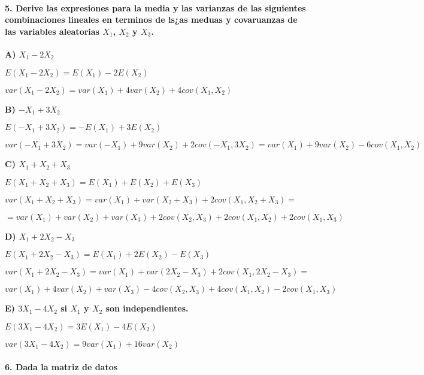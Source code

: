 \documentclass[
]{article}
\begin{document}
\hypertarget{derive-las-expresiones-para-la-media-y-las-varianzas-de-las-siguientes-combinaciones-lineales-en-terminos-de-lsas-meduas-y-covaruanzas-de-las-variables-aleatorias-x_1-x_2-y-x_3.}{%
\paragraph{\texorpdfstring{5. Derive las expresiones para la media y las
varianzas de las siguientes combinaciones lineales en terminos de ls¿as
meduas y covaruanzas de las variables aleatorias \(X_1\), \(X_2\) y
\(X_3\).}{5. Derive las expresiones para la media y las varianzas de las siguientes combinaciones lineales en terminos de ls¿as meduas y covaruanzas de las variables aleatorias X\_1, X\_2 y X\_3.}}\label{derive-las-expresiones-para-la-media-y-las-varianzas-de-las-siguientes-combinaciones-lineales-en-terminos-de-lsas-meduas-y-covaruanzas-de-las-variables-aleatorias-x_1-x_2-y-x_3.}}

\textbf{A) \(X_1-2X_2\)}

\(E(X_1-2X_2) = E(X_1)-2E(X_2)\)

\(var(X_1-2X_2) = var(X_1)+4var(X_2)+4cov(X_1,X_2)\)

\textbf{B) \(-X_1+3X_2\)}

\(E(-X_1+3X_2) = -E(X_1)+3E(X_2)\)

\(var(-X_1+3X_2) = var(-X_1)+9var(X_2)+2cov(-X_1,3X_2) = var(X_1)+9var(X_2)-6cov(X_1,X_2)\)

\textbf{C) \(X_1+X_2+X_3\)}

\(E(X_1+X_2+X_3) = E(X_1)+E(X_2)+E(X_3)\)

\(var(X_1+X_2+X_3) = var(X_1)+var(X_2+X_3)+2cov(X_1,X_2+X_3) =\)

\(=var(X_1)+var(X_2)+var(X_3)+2cov(X_2,X_3)+2cov(X_1,X_2)+2cov(X_1,X_3)\)

\textbf{D) \(X_1+2X_2-X_3\)}

\(E(X_1+2X_2-X_3) = E(X_1)+2E(X_2)-E(X_3)\)

\(var(X_1+2X_2-X_3)= var(X_1)+var(2X_2-X_3)+2cov(X_1,2X_2-X_3) =\)

\(var(X_1)+4var(X_2)+var(X_3)-4cov(X_2,X_3)+4cov(X_1,X_2)-2cov(X_1,X_3)\)

\textbf{E) \(3X_1-4X_2\) si \(X_1\) y \(X_2\) son independientes. }

\(E(3X_1-4X_2) = 3E(X_1)-4E(X_2)\)

\(var(3X_1-4X_2)=9var(X_1)+16var(X_2)\)

\hypertarget{dada-la-matriz-de-datos}{%
\paragraph{6. Dada la matriz de datos}\label{dada-la-matriz-de-datos}}
\end{document}
